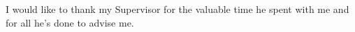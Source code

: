 \documentclass[english,master,unicode,bw]{ctufit-thesis}
\theoremstyle{plain}
\theoremstyle{definition}
\theoremstyle{remark}
\numberwithin{theorem}{chapter}
\begin{document}
\frontmatter\frontmatterinit %


\thispagestyle{empty}\cleardoublepage\maketitle %

\imprintpage %

\tableofcontents %
\listoffigures %
\begingroup
\let\clearpage\relax
\listoftables %
\lstlistoflistings %
\endgroup

\begin{acknowledgmentpage}
    I would like to thank my Supervisor for the valuable time he spent with me and for all he's done to advise me.
\end{acknowledgmentpage}
\end{document}
